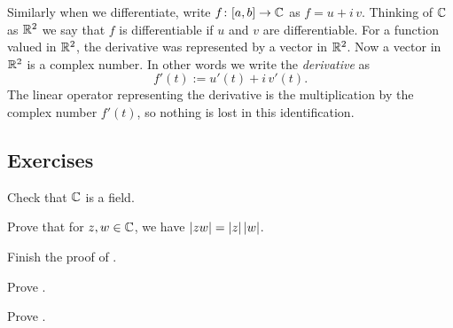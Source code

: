 Similarly when we differentiate, write $f \colon [a,b] \to {\mathbb{C}}$ as
$f = u+i\,v$.  Thinking of ${\mathbb{C}}$ as ${\mathbb{R}}^2$ we say that $f$ is differentiable
if $u$ and $v$ are differentiable.  For a function valued in ${\mathbb{R}}^2$, the derivative
was represented by a vector in ${\mathbb{R}}^2$.  Now a vector in ${\mathbb{R}}^2$ is a complex
number.  In other words
we write
the
\emph{derivative}
as
\begin{equation*}
f'(t) := u'(t) + i \, v'(t) .
\end{equation*}
The linear operator representing the derivative is the multiplication by
the complex number $f'(t)$, so nothing is lost in this identification.


\subsection{Exercises}

\begin{exercise}
Check that ${\mathbb{C}}$ is a field.
\end{exercise}

\begin{exercise}
Prove that for $z,w \in {\mathbb{C}}$, we have
$\lvert {zw} \rvert = \lvert {z} \rvert \, \lvert {w} \rvert$.
\end{exercise}

\begin{exercise}
Finish the proof of .
\end{exercise}

\begin{exercise}
Prove .
\end{exercise}

\begin{exercise}
Prove .
\end{exercise}


